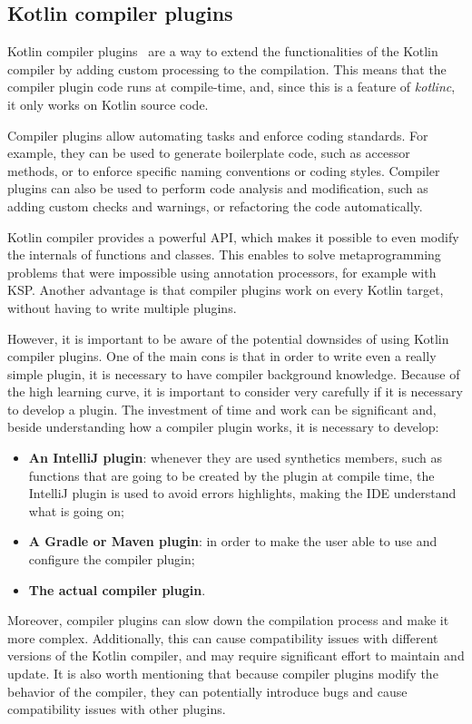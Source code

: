 \subsection{Kotlin compiler plugins}\label{section:compiler_plugin_explanation}
Kotlin compiler plugins~\cite{compiler_plugins_jetbrains} are a way to extend the functionalities of the Kotlin compiler by adding custom processing to the compilation. This means that the compiler plugin code runs at compile-time, and, since this is a feature of \textit{kotlinc}, it only works on Kotlin source code.

Compiler plugins allow automating tasks and enforce coding standards. For example, they can be used to generate boilerplate code, such as accessor methods, or to enforce specific naming conventions or coding styles. Compiler plugins can also be used to perform code analysis and modification, such as adding custom checks and warnings, or refactoring the code automatically.

Kotlin compiler provides a powerful API, which makes it possible to even modify the internals of functions and classes. This enables to solve metaprogramming problems that were impossible using annotation processors, for example with KSP. Another advantage is that compiler plugins work on every Kotlin target, without having to write multiple plugins.

However, it is important to be aware of the potential downsides of using Kotlin compiler plugins. One of the main cons is that in order to write even a really simple plugin, it is necessary to have compiler background knowledge. Because of the high learning curve, it is important to consider very carefully if it is necessary to develop a plugin. The investment of time and work can be significant and, beside understanding how a compiler plugin works, it is necessary to develop:
\begin{itemize}
    \item \textbf{An IntelliJ plugin}: whenever they are used synthetics members, such as functions that are going to be created by the plugin at compile time, the IntelliJ plugin is used to avoid errors highlights, making the IDE understand what is going on;
    \item \textbf{A Gradle or Maven plugin}: in order to make the user able to use and configure the compiler plugin;
    \item \textbf{The actual compiler plugin}.
\end{itemize}

Moreover, compiler plugins can slow down the compilation process and make it more complex. Additionally, this can cause compatibility issues with different versions of the Kotlin compiler, and may require significant effort to maintain and update. It is also worth mentioning that because compiler plugins modify the behavior of the compiler, they can potentially introduce bugs and cause compatibility issues with other plugins.

